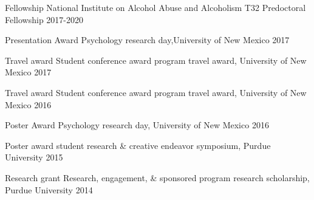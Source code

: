 



\begin{cvhonors}

  \cvhonor
    {Fellowship} %
    {National Institute on Alcohol Abuse and Alcoholism T32 Predoctoral Fellowship} %
    {} %
    {2017-2020} %

  \cvhonor
    {Presentation Award} %
    {Psychology research day,University of New Mexico} %
    {} %
    {2017} %

  \cvhonor
    {Travel award} %
    {Student conference award program travel award, University of New Mexico} %
    {} %
    {2017} %
    
  \cvhonor
    {Travel award} %
    {Student conference award program travel award, University of New Mexico} %
    {} %
    {2016} %

  \cvhonor
    {Poster Award} %
    {Psychology research day, University of New Mexico} %
    {} %
    {2016} %

  \cvhonor
    {Poster award} %
    {student research \& creative endeavor symposium, Purdue University} %
    {} %
    {2015} %

  \cvhonor
    {Research grant} %
    {Research, engagement, \& sponsored program research scholarship, Purdue University} %
    {} %
    {2014} %
\end{cvhonors}


